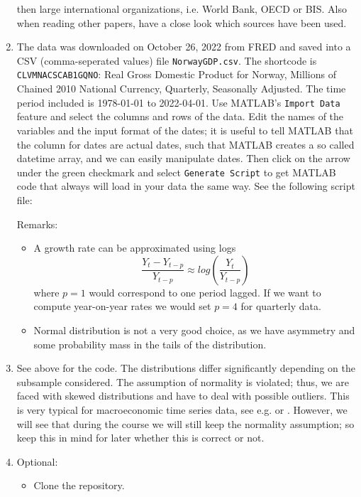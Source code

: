 \begin{enumerate}
  then large international organizations, i.e. World Bank, OECD or BIS.
Also when reading other papers, have a close look which sources have been used.
\item
The data was downloaded on October 26, 2022 from FRED and saved into a CSV (comma-seperated values) file \texttt{NorwayGDP.csv}.
The shortcode is \texttt{CLVMNACSCAB1GQNO}: Real Gross Domestic Product for Norway, Millions of Chained 2010 National Currency, Quarterly, Seasonally Adjusted.
The time period included is 1978-01-01 to 2022-04-01.
Use MATLAB's \texttt{Import Data} feature and select the columns and rows of the data.
Edit the names of the variables and the input format of the dates;
  it is useful to tell MATLAB that the column for dates are actual dates,
  such that MATLAB creates a so called datetime array,
  and we can easily manipulate dates.
Then click on the arrow under the green checkmark and select \texttt{Generate Script} to get MATLAB code that always will load in your data the same way.
See the following script file:

Remarks:
\begin{itemize}
    \item A growth rate can be approximated using logs $$\frac{Y_t - Y_{t-p}}{Y_{t-p}} \approx log \left(\frac{Y_t}{Y_{t-p}}\right)$$
      where $p=1$ would correspond to one period lagged. If we want to compute year-on-year rates we would set $p=4$ for quarterly data.
    \item Normal distribution is not a very good choice, as we have asymmetry and some probability mass in the tails of the distribution.		
\end{itemize}
\item See above for the code. The distributions differ significantly depending on the subsample considered.
The assumption of normality is violated; thus, we are faced with skewed distributions and have to deal with possible outliers.
This is very typical for macroeconomic time series data, see e.g. \textcite{Ascari.Fagiolo.Roventini_2015_FatTailDistributionsBusinessCycle} or \textcite{Fagiolo.Napoletano.Roventini_2008_AreOutputGrowthrate}.
However, we will see that during the course we will still keep the normality assumption;
  so keep this in mind for later whether this is correct or not.
\item Optional:
\begin{itemize}
    \item Clone the repository.

\end{itemize}
\end{enumerate}
